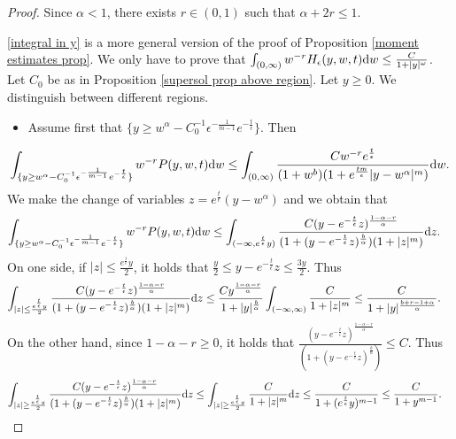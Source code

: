 \documentclass[11pt]{article}
\numberwithin{equation}{section}
\newcommand{\der}{\textup{d}}
\begin{document}
\begin{proof}
Since $\alpha<1$, there exists $r\in(0,1)$ such that $\alpha+2r\leq 1$. 


\eqref{integral in y} is a more general version of the proof of Proposition \ref{moment estimates prop}. We only have to prove that $\int_{(0,\infty)}w^{-r}H_{\epsilon}(y,w,t)\der w\leq \frac{C}{1+|y|^{\omega}}$. Let $C_{0}$ be as in Proposition \ref{supersol prop above region}. Let $y\geq 0$. We distinguish between different regions. \begin{itemize}
\item Assume first that $\{y\geq w^{\alpha}-C_{0}^{-1}\epsilon^{-\frac{1}{m-1}} e^{-\frac{t}{\epsilon}}\}$. Then
\end{itemize}
\begin{align*}
    \int_{\{y\geq w^{\alpha}-C_{0}^{-1}\epsilon^{-\frac{1}{m-1}} e^{-\frac{t}{\epsilon}}\}}w^{-r}P(y,w,t)\der w\leq \int_{(0,\infty)} \frac{Cw^{-r}e^{\frac{t}{\epsilon}}}{(1+w^{b})(1+e^{\frac{tm}{\epsilon}}|y-w^{\alpha}|^{m})}\der w.
\end{align*}
 We make the change of variables
 $z=e^{\frac{t}{\epsilon}}(y-w^{\alpha})$ and we obtain that
 \begin{align*}
        \int_{\{y\geq w^{\alpha}-C_{0}^{-1}\epsilon^{-\frac{1}{m-1}} e^{-\frac{t}{\epsilon}}\}}w^{-r}P(y,w,t)\der w&\leq \int_{(-\infty,e^{\frac{t}{\epsilon}}y)} \frac{C(y-e^{-\frac{t}{\epsilon}}z)^{\frac{1-\alpha-r}{\alpha}}}{(1+(y-e^{-\frac{t}{\epsilon}}z)^{\frac{b}{\alpha}})(1+|z|^{m})}\der z.
        \end{align*}
      On one side, if $|z|\leq \frac{e^{\frac{t}{\epsilon}}y}{2}$, it holds that $\frac{y}{2}\leq y-e^{-\frac{t}{\epsilon}}z\leq \frac{3 y}{2}$. Thus
        \begin{align}\label{step 1 moments general} \int_{|z|\leq \frac{e^{\frac{t}{\epsilon}}y}{2}} \frac{C(y-e^{-\frac{t}{\epsilon}}z)^{\frac{1-\alpha-r}{\alpha}}}{(1+(y-e^{-\frac{t}{\epsilon}}z)^{\frac{b}{\alpha}})(1+|z|^{m})}\der z&\leq \frac{C  y^{\frac{1-\alpha-r}{\alpha}}}{1+|y|^{\frac{b}{\alpha}}}\int_{(-\infty,\infty)} \frac{C}{1+|z|^{m}}\leq\frac{C}{1+|y|^{\frac{b+r-1+\alpha}{\alpha}}}.
 \end{align}
On the other hand, since  $1-\alpha-r\geq 0$, it holds that $\frac{(y-e^{-\frac{t}{\epsilon}}z)^{\frac{1-\alpha-r}{\alpha}}}{(1+(y-e^{-\frac{t}{\epsilon}}z)^{\frac{b}{\alpha}})}\leq C$. Thus
\begin{align}\label{step 2 moments general}
   \int_{ |z|\geq \frac{e^{\frac{t}{\epsilon}}y}{2}} \frac{C(y-e^{-\frac{t}{\epsilon}}z)^{\frac{1-\alpha-r}{\alpha}}}{(1+(y-e^{-\frac{t}{\epsilon}}z)^{\frac{b}{\alpha}})(1+|z|^{m})}\der z&\leq   \int_{ |z|\geq \frac{e^{\frac{t}{\epsilon}}y}{2}} \frac{C}{1+|z|^{m}}\der z\leq \frac{C}{1+(e^{\frac{t}{\epsilon}}y)^{m-1}}\leq\frac{C}{1+y^{m-1}}.

\end{align}
\end{proof}
\end{document}
